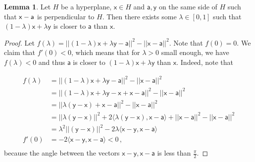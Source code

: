 \documentclass[12pt]{amsart}
\theoremstyle{definition}
\newtheorem{lm}[thm]{Lemma}
\newcommand{\vx}{\mathsf{x}}
\newcommand{\vy}{\mathsf{y}}
\newcommand{\va}{\mathsf{a}}
\begin{document}
\begin{lm}\label{lm:closeness}
Let $H$ be a hyperplane, $\vx \in H$ and $\va, \vy$ on the same side of $H$ such that $\vx \-- \va$ is perpendicular to $H$.
Then there exists some $\lambda \in [0, 1]$ such that $(1-\lambda) \vx +\lambda \vy$ is closer to $\va$ than $\vx$.
\end{lm}

\begin{proof}
Let $f(\lambda)  = || (1-\lambda) \vx +\lambda \vy - \va ||^2 - ||\vx - \va||^2$.
Note that $f(0) = 0$.
We claim that $f'(0) < 0$, which means that for $\lambda >0 $ small enough, we have $f(\lambda) < 0$ and thus  $\va$ is closer to $(1-\lambda) \vx +\lambda \vy$ than $\vx$.
Indeed, note that

\begin{align*}
f(\lambda) &=  || (1-\lambda) \vx +\lambda \vy - \va ||^2 - ||\vx - \va||^2\\
&=  || (1-\lambda) \vx +\lambda \vy - \vx + \vx - \va ||^2 - ||\vx - \va||^2\\
&=  || \lambda(\vy - \vx ) + \vx - \va ||^2 - ||\vx - \va||^2\\
&=  || \lambda(\vy - \vx )||^2 + 2\langle \lambda(\vy - \vx ),  \vx - \va\rangle + || \vx - \va ||^2 - || \vx - \va ||^2 \\
&=   \lambda^2 ||(\vy - \vx )||^2 - 2\lambda \langle \vx - \vy,  \vx - \va\rangle\\
f'(0) &=  -2 \langle \vx - \vy,  \vx - \va\rangle < 0\, ,\\
\end{align*}
because the angle between the vectors $\vx - \vy,  \vx - \va$ is less than $\frac{\pi}{2}$.
\end{proof}
\end{document}
